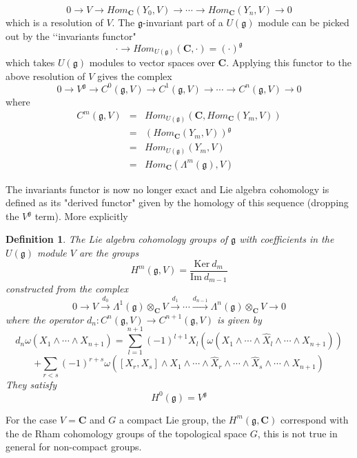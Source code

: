 \documentclass[a4paper,a4paper]{article}
\newtheorem{define}{Definition}
\theoremstyle{conjecture}
\begin{document}
$$0\longrightarrow V\longrightarrow Hom_{\mathbf C}(Y_0,V)\longrightarrow\cdots
\longrightarrow Hom_{\mathbf C}(Y_n,V)\longrightarrow 0$$
which is a resolution of $V$.  The $\mathfrak g$-invariant part of a $U(\mathfrak g)$ module
can be picked out by the \lq\lq invariants functor"
$$\cdot\longrightarrow Hom_{U(\mathfrak g)}(\mathbf C,\cdot)= (\cdot)^{\mathfrak g}$$
which takes $U(\mathfrak g)$ modules to vector spaces over $\mathbf C$.  Applying this
functor to the above resolution of $V$ gives the complex
$$0\longrightarrow V^{\mathfrak g} \longrightarrow C^0(\mathfrak g,V)\longrightarrow
C^1(\mathfrak g,V)\longrightarrow\cdots\longrightarrow C^n(\mathfrak g,V)\longrightarrow 0$$
where
\begin{eqnarray*}
C^m(\mathfrak g,V)&=&Hom_{U(\mathfrak g)}(\mathbf C,Hom_{\mathbf C}(Y_m,V))\\
&=&(Hom_{\mathbf C}(Y_m,V))^{\mathfrak g}\\
&=&Hom_{U(\mathfrak g)}(Y_m,V)\\
&=&Hom_{\mathbf C}(\Lambda^m(\mathfrak g),V)
\end{eqnarray*}

The invariants functor is now no longer exact and Lie algebra
cohomology is defined as its "derived functor" given by the
homology of this sequence (dropping the $ V^{\mathfrak g}$ term).
More explicitly

\begin{define}
The Lie algebra cohomology groups of $\mathfrak g$ with coefficients in the $U(\mathfrak g)$ module $V$
are the groups
$$H^m(\mathfrak g, V)=\frac{\mathrm{Ker\ }d_m}{\mathrm{Im\ }d_{m-1}}$$
constructed from the complex
$$0\longrightarrow V\stackrel{d_0}\longrightarrow \Lambda^1(\mathfrak g)\otimes_{\mathbf C}V
\stackrel{d_1}\longrightarrow\cdots\stackrel{d_{n-1}}\longrightarrow\Lambda^n(\mathfrak g)\otimes_{\mathbf C}V
\longrightarrow 0$$
where the operator $d_n : C^n(\mathfrak g,V)\rightarrow C^{n+1}(\mathfrak g,V)$ is given by
$$d_n\omega(X_1\wedge\cdots\wedge X_{n+1})=\sum_{l=1}^{n+1}(-1)^{l+1}X_l(\omega(X_1\wedge\cdots\wedge\hat X_l
\wedge\cdots\wedge X_{n+1}))$$
$$+\sum_{r<s}(-1)^{r+s}\omega([X_r,X_s]\wedge X_1\wedge\cdots\wedge\hat X_r\wedge\cdots\wedge\hat X_s
\wedge\cdots\wedge X_{n+1})$$
They satisfy
$$H^0(\mathfrak g)=V^{\mathfrak g}$$
\end{define}

For the case $V=\mathbf C$ and $G$ a compact Lie group, the $H^m({\mathfrak g},\mathbf C)$ correspond
with the de Rham cohomology groups of the topological space $G$, this is not true in general
for non-compact groups.
\end{document}
